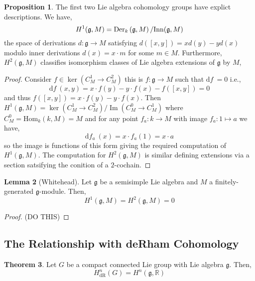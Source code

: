 \documentclass[12pt]{extarticle}
\newcommand{\Hom}[3]{\mathrm{Hom}_{#1}\left( #2, #3 \right)}
\DeclareMathOperator{\im}{\mathrm{Im}}
\newcommand{\R}{\mathbb{R}}
\renewcommand{\d}[1]{ \mathrm{d}#1 \:}
\theoremstyle{definition}
\newtheorem{theorem}{Theorem}[section]
\newtheorem{lemma}[theorem]{Lemma}
\newtheorem{proposition}[theorem]{Proposition}
\newcommand{\g}{\mathfrak{g}}
\newcommand{\h}{\mathfrak{h}}
\begin{document}
\newcommand{\Inn}{\mathrm{Inn}}

\begin{proposition}
The first two Lie algebra cohomology groups have explict descriptions. We have, 
\[ H^1(\g, M) = \Der{k}{\g}{M} / \Inn(\g, M) \]
the space of derivations $d : \g \to M$ satisfying $d([x, y]) = x d(y) - y d(x)$ modulo inner derivations $d(x) = x \cdot m$ for some $m \in M$. Furthermore, $H^2(\g, M)$ classifies isomorphism classes of Lie algebra extensions of $\g$ by $M$,
\begin{center}
\end{center}
\end{proposition}

\begin{proof}
Consider $f \in \ker{(C^1_M \to C^2_M)}$ this is $f : \g \to M$ such that $\d{f} = 0$ i.e.,
\[ \d{f}(x, y) = x \cdot f(y) - y \cdot f(x) - f([x, y]) = 0 \]
and thus $f([x,y]) = x \cdot f(y) - y \cdot f(x)$. Then $H^1(\g, M) = \ker{(C^1_M \to C^2_M)} / \im{(C^0_M \to C^1_M)}$ where $C^0_M = \Hom{k}{k}{M} = M$ and for any point $f_a : k \to M$ with image $f_a : 1 \mapsto a$ we have,
\[ \d{f_a}(x) = x \cdot f_a(1) = x \cdot a \]
so the image is functions of this form giving the required computation of $H^1(\g, M)$. The computation for $H^2(\g, M)$ is similar defining extensions via a section satsifying the conition of a $2$-cochain. 
\end{proof}

\begin{lemma}[Whitehead]
Let $\g$ be a semisimple Lie algebra and $M$ a finitely-generated $\g$-module. Then,
\[ H^1(\g, M) = H^2(\g, M) = 0 \]
\end{lemma}


\begin{proof}
(DO THIS)
\end{proof}



\subsection{The Relationship with deRham Cohomology}


\begin{theorem}
Let $G$ be a compact connected Lie group with Lie algebra $\g$. Then,
\[ H^n_{\text{dR}}(G) = H^n(\g, \R) \]
\end{theorem}
\end{document}

